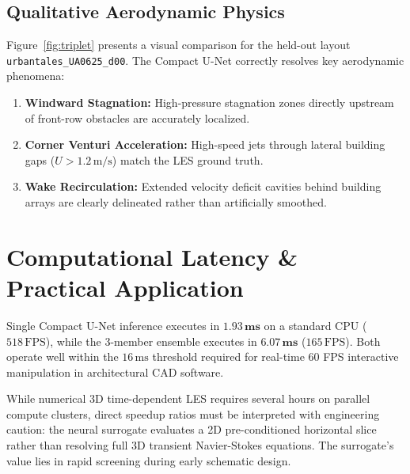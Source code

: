 \documentclass[10pt,twocolumn]{article}
\begin{document}
\subsection{Qualitative Aerodynamic Physics}
Figure~\ref{fig:triplet} presents a visual comparison for the held-out layout \texttt{urbantales\_UA0625\_d00}. The Compact U-Net correctly resolves key aerodynamic phenomena:
\begin{enumerate}
    \item \textbf{Windward Stagnation:} High-pressure stagnation zones directly upstream of front-row obstacles are accurately localized.
    \item \textbf{Corner Venturi Acceleration:} High-speed jets through lateral building gaps ($U > 1.2\,\text{m/s}$) match the LES ground truth.
    \item \textbf{Wake Recirculation:} Extended velocity deficit cavities behind building arrays are clearly delineated rather than artificially smoothed.
\end{enumerate}

\section{Computational Latency & Practical Application}
Single Compact U-Net inference executes in $\mathbf{1.93\,\text{ms}}$ on a standard CPU ($518\,\text{FPS}$), while the 3-member ensemble executes in $\mathbf{6.07\,\text{ms}}$ ($165\,\text{FPS}$). Both operate well within the $16\,\text{ms}$ threshold required for real-time 60 FPS interactive manipulation in architectural CAD software.

While numerical 3D time-dependent LES requires several hours on parallel compute clusters, direct speedup ratios must be interpreted with engineering caution: the neural surrogate evaluates a 2D pre-conditioned horizontal slice rather than resolving full 3D transient Navier-Stokes equations. The surrogate's value lies in rapid screening during early schematic design.
\end{document}
